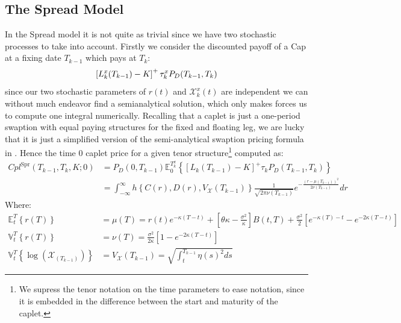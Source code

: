 \documentclass[12pt]{article}
\begin{document}
\subsection{The Spread Model}
In the Spread model it is not
quite as trivial since we have two stochastic processes
to take into account.
Firstly we consider the discounted payoff of a Cap at a
fixing date $T_{k-1}$ which pays at $T_k$:
\begin{equation}
    \notag \left[L_k^x(T_{k-1}) - K\right]^+  \tau_k^xP_D(T_{k-1},T_k)
\end{equation}
since our two stochastic parameters of $r(t)$ and $\mathcal{X}_k^x(t)$
are independent we can
without much endeavor find a semianalytical
solution, which only makes forces us to compute one integral
numerically. Recalling that a caplet is
just a one-period swaption with equal paying
structures for the fixed and floating leg, we
are lucky that it is just a simplified version
of the semi-analytical swaption pricing formula in
\cite{MercXieStochBasis2012}. Hence the
time 0 caplet price for a given
tenor structure\footnote{We
supress the tenor notation on the time parameters
to ease notation, since
it is embedded in the difference between the start
and maturity of the caplet.} computed as:
\begin{equation}
    \begin{aligned}
        Cpl^{\text{Spr}}
        (T_{k-1} , T_k , K;0) & =
        P_D(0,T_{k-1})\mathbb{E}^{T_k^x}_0 \left\{
        \left[L_k(T_{k-1}) - K\right]^+  \tau_k P_D(T_{k-1},T_k)
         \right\} \\
         & =
         \int_{-\infty}^{\infty} h \left\{ C(r) ,
         D(r) , V_\mathcal{X}(T_{k-1}) \right\}
         \frac{1}{\sqrt{2\pi \nu(T_{k-1})}}
         e ^{-\frac{\left(r-\mu
         \left( T_{k-1} \right) \right )^2}
         {2 \nu( T_{k-1})}}
         dr
    \end{aligned}
\end{equation}
Where:
\begin{equation}
    \begin{aligned}
        \mathbb{E}^{T}_t\left\{ r(T) \right\}
    &= \mu(T) = r(t)e ^{- \kappa(T- t)}
    + \left[\theta\kappa
    - \frac{\sigma ^2}{\kappa}\right]
    B \left( t, T \right)  +
   \frac{\sigma^2}{2} \left[
   e ^{-\kappa(T) - t} - e ^{-2\kappa (T- t)}\right] \\
   \mathbb{V}^T_t \left\{ r(T) \right\}
  & = \nu(T) = \frac{\sigma^2}{2\kappa} \left[
  1- e ^{-2 \kappa(T - t)} \right] \\
       \mathbb{V}_t ^T
        \left\{ \log(\mathcal{X}_(T_{k-1})) \right\} &
        = V_\mathcal{X}(T_{k-1}) = \sqrt{\int_{t}^{T_{k-1}} \eta(s)^2 ds}
    \end{aligned}
\end{equation}
\end{document}
